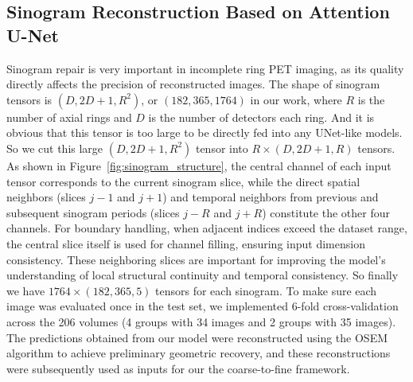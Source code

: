 \documentclass[
reprint,
superscriptaddress,
nofootinbib,
amsmath,amssymb,
aps,
prd,
]{revtex4-2}
\begin{document}

\subsection{Sinogram Reconstruction Based on Attention U-Net}
\label{sec:unet_sinogram}

Sinogram repair is very important in incomplete ring PET imaging, as its quality directly affects the precision of reconstructed images. 
The shape of sinogram tensors is $(D, 2D+1, R^2)$, or $(182, 365, 1764)$ in our work, where $R$ is the number of axial rings and $D$ is the number of detectors each ring. And it is obvious that this tensor is too large to be directly fed into any UNet-like models. So we cut this large $(D, 2D+1, R^2)$ tensor into $R\times(D, 2D+1, R)$ tensors. 
As shown in Figure~\ref{fig:sinogram_structure}, the central channel of each input tensor corresponds to the current sinogram slice, while the direct spatial neighbors (slices $j-1$ and $j+1$) and temporal neighbors from previous and subsequent sinogram periods (slices $j-R$ and $j+R$) constitute the other four channels. For boundary handling, when adjacent indices exceed the dataset range, the central slice itself is used for channel filling, ensuring input dimension consistency. These neighboring slices are important for improving the model's understanding of local structural continuity and temporal consistency. So finally we have $1764\times(182, 365, 5)$ tensors for each sinogram. 
To make sure each image was evaluated once in the test set, we implemented 6-fold cross-validation across the 206 volumes (4 groups with 34 images and 2 groups with 35 images). The predictions obtained from our model were reconstructed using the OSEM algorithm to achieve preliminary geometric recovery, and these reconstructions were subsequently used as inputs for our the coarse-to-fine framework.
\end{document}
